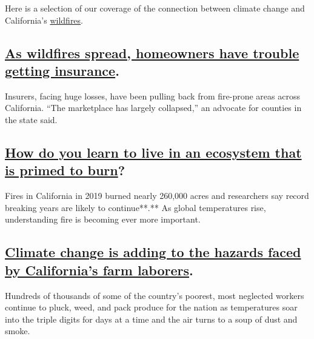 Here is a selection of our coverage of the connection between climate
change and California's
\href{https://www.nytimes3xbfgragh.onion/2020/09/09/us/fires-washington-california-oregon-malden.html}{wildfires}.

\hypertarget{as-wildfires-spread-homeowners-have-trouble-getting-insurance}{%
\subsection{\texorpdfstring{\href{https://www.nytimes3xbfgragh.onion/2020/09/02/climate/wildfires-insurance.html}{As
wildfires spread, homeowners have trouble getting
insurance}.}{As wildfires spread, homeowners have trouble getting insurance.}}\label{as-wildfires-spread-homeowners-have-trouble-getting-insurance}}

Insurers, facing huge losses, have been pulling back from fire-prone
areas across California. ``The marketplace has largely collapsed,'' an
advocate for counties in the state said.

\hypertarget{how-do-you-learn-to-live-in-an-ecosystem-that-is-primed-to-burn}{%
\subsection{\texorpdfstring{\href{https://www.nytimes3xbfgragh.onion/2019/10/24/climate/california-wildfires-climate-change.html}{How
do you learn to live in an ecosystem that is primed to
burn}?}{How do you learn to live in an ecosystem that is primed to burn?}}\label{how-do-you-learn-to-live-in-an-ecosystem-that-is-primed-to-burn}}

Fires in California in 2019 burned nearly 260,000 acres and researchers
say record breaking years are likely to continue**.** As global
temperatures rise, understanding fire is becoming ever more important.

\hypertarget{climate-change-is-adding-to-the-hazards-faced-by-californias-farm-laborers}{%
\subsection{\texorpdfstring{\href{https://www.nytimes3xbfgragh.onion/2020/08/25/climate/california-farm-workers-climate-change.html}{Climate
change is adding to the hazards faced by California's farm
laborers}.}{Climate change is adding to the hazards faced by California's farm laborers.}}\label{climate-change-is-adding-to-the-hazards-faced-by-californias-farm-laborers}}

Hundreds of thousands of some of the country's poorest, most neglected
workers continue to pluck, weed, and pack produce for the nation as
temperatures soar into the triple digits for days at a time and the air
turns to a soup of dust and smoke.

